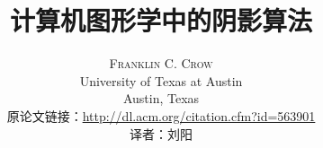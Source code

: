 \documentclass[a4paper, twocolumn]{article}
\title{计算机图形学中的阴影算法} %
\author{%
	\textsc{Franklin C. Crow} \\[1ex] %
	\normalsize University of Texas at Austin \\ %
	\normalsize Austin, Texas \\ %
	\normalsize 原论文链接：\href{http://dl.acm.org/citation.cfm?id=563901}{http://dl.acm.org/citation.cfm?id=563901} \\
	\normalsize 译者：刘阳
}
\date{} %
\begin{document}
\begin{CJK}{UTF8}{gbsn}
	\maketitle
	
	
	
	
	
	
	
	
	
	
	
	\renewcommand{\refname}{参考文献}
	
	
\end{CJK}	
\end{document}
